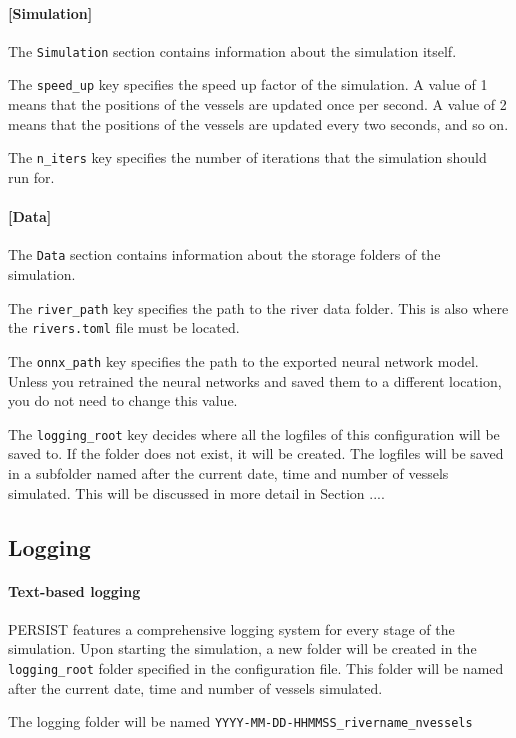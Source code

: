 \documentclass[
	a4paper, %
	12pt, %
]{persist}
\begin{document}
\paragraph{[Simulation]}

The \verb|Simulation| section contains information about the simulation itself.

The \verb|speed_up| key specifies the speed up factor of the simulation. A value of 1 means that the positions of the vessels are updated once per second. A value of 2 means that the positions of the vessels are updated every two seconds, and so on.

The \verb|n_iters| key specifies the number of iterations that the simulation should run for.

\paragraph{[Data]}

The \verb|Data| section contains information about the storage folders of the simulation.

The \verb|river_path| key specifies the path to the river data folder. This is also where the \verb|rivers.toml| file must be located.

The \verb|onnx_path| key specifies the path to the exported neural network model. Unless you retrained the neural networks and saved them to a different location, you do not need to change this value.

The \verb|logging_root| key decides where all the logfiles of this configuration will be saved to. If the folder does not exist, it will be created. The logfiles will be saved in a subfolder named after the current date, time and number of vessels simulated. This will be discussed in more detail in Section ....

\subsection{Logging}

\paragraph{Text-based logging}

PERSIST features a comprehensive logging system for every stage of the simulation. Upon starting the simulation, a new folder will be created in the \verb|logging_root| folder specified in the configuration file. This folder will be named after the current date, time and number of vessels simulated. 
\begin{note}
	The logging folder will be named \verb|YYYY-MM-DD-HHMMSS_rivername_nvessels|
\end{note}
\end{document}
